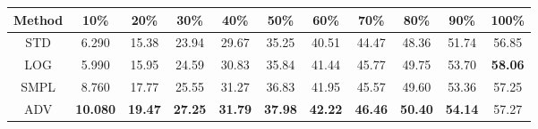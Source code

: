 \documentclass{standalone}
\begin{document}
\begin{tabular}{c|cccccccccc}
      \toprule
      Method & 10\% & 20\% & 30\% & 40\% & 50\% & 60\% & 70\% & 80\% & 90\% & 100\% \\
      \midrule
STD & 6.290 & 15.38 & 23.94 & 29.67 & 35.25 & 40.51 & 44.47 & 48.36 & 51.74 & 56.85\\
LOG & 5.990 & 15.95 & 24.59 & 30.83 & 35.84 & 41.44 & 45.77 & 49.75 & 53.70 & \textbf{58.06}\\
SMPL & 8.760 & 17.77 & 25.55 & 31.27 & 36.83 & 41.95 & 45.57 & 49.60 & 53.36 & 57.25\\
ADV & \textbf{10.080} & \textbf{19.47} & \textbf{27.25} & \textbf{31.79} & \textbf{37.98} & \textbf{42.22} & \textbf{46.46} & \textbf{50.40} & \textbf{54.14} & 57.27\\
  \bottomrule
\end{tabular}
\end{document}
